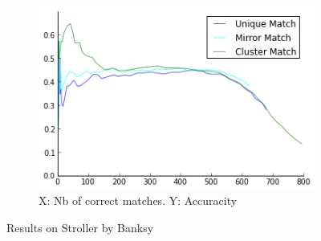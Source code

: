 \documentclass{article}
\begin{document}
\begin{figure}
{\begin{subfigure}[t]{0.35\textwidth}
			\centering
			\includegraphics[width=\textwidth]{images/result_banksy_stroller}
			\caption{X: Nb of correct matches. Y: Accuracity}
			\label{fig:result_stroller}
		\end{subfigure}%
	}%
	\label{fig:stroller}
	\caption{Results on Stroller by Banksy}
\end{figure}
\end{document}
